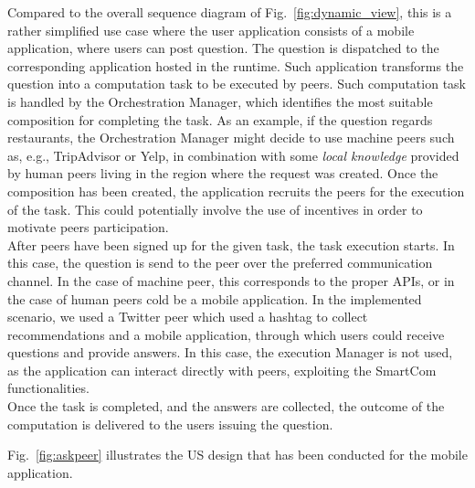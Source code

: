 Compared to the overall sequence diagram of Fig.~\ref{fig:dynamic_view}, this is a rather simplified use case where the user application consists of a mobile application, where users can post question. The question is dispatched to the corresponding application hosted in the runtime. Such application transforms the question into a computation task to be executed by peers. Such computation task is handled by the Orchestration Manager, which identifies the most suitable composition for completing the task. As an example, if the question regards restaurants, the Orchestration Manager might decide to use machine peers such as, e.g., TripAdvisor or Yelp, in combination with some \textit{local knowledge} provided by human peers living in the region where the request was created. Once the composition has been created, the application recruits the peers for the execution of the task. This could potentially involve the use of incentives in order to motivate peers participation.\\
After peers have been signed up for the given task, the task execution starts. In this case, the question is send to the peer over the preferred communication channel. In the case of machine peer, this corresponds to the proper APIs, or in the case of human peers cold be a mobile application. In the implemented scenario, we used a Twitter peer which used a hashtag to collect recommendations and a mobile application, through which users could receive questions and provide answers. In this case, the execution Manager is not used, as the application can interact directly with peers, exploiting the SmartCom functionalities.\\
Once the task is completed, and the answers are collected, the outcome of the computation is delivered to the users issuing the question.

Fig.~\ref{fig:askpeer} illustrates the US design that has been conducted for the mobile application.


